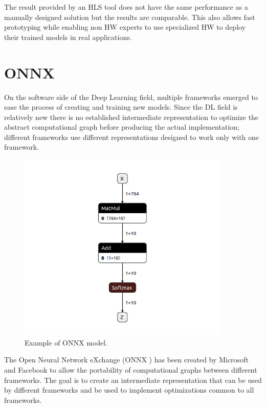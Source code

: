 \documentclass[../main.tex]{subfiles}
\begin{document}
The result provided by an HLS tool does not have the same performance as a manually designed solution but the results are comparable. 
This also allows fast prototyping while enabling non HW experts to use specialized HW to deploy their trained models in real applications.

\section{ONNX}
\label{ONNX}

On the software side of the Deep Learning field, multiple frameworks emerged to ease the process of creating and training new models.
Since the DL field is relatively new there is no established intermediate representation to optimize the abstract computational graph before producing the actual implementation; different frameworks use different representations designed to work only with one framework.

\begin{figure}[h!]
  \includegraphics[width=0.9\textwidth]{images/ONNXExample.png}
  \centering
  \caption{Example of ONNX model.}
  \label{fig:onnx-example}
\end{figure}

The Open Neural Network eXchange (ONNX \cite{onnx}) has been created by Microsoft and Facebook to allow the portability of computational graphs between different frameworks. 
The goal is to create an intermediate representation that can be used by different frameworks and be used to implement optimizations common to all frameworks.
\end{document}
